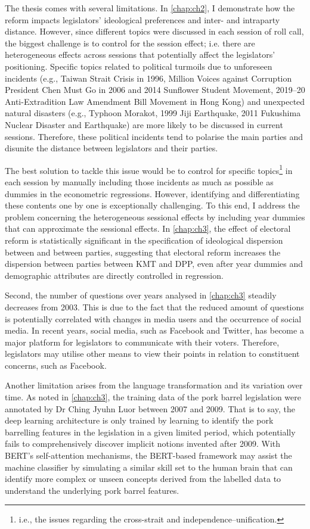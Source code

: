 The thesis comes with several limitations. In \autoref{chap:ch2}, I demonstrate how the reform impacts legislators' ideological preferences and inter- and intraparty distance. However, since different topics were discussed in each session of roll call, the biggest challenge is to control for the session effect; i.e. there are heterogeneous effects across sessions that potentially affect the legislators' positioning. Specific topics related to political turmoils due to unforeseen incidents (e.g., Taiwan Strait Crisis in 1996, Million Voices against Corruption President Chen Must Go in 2006 and 2014 Sunflower Student Movement, 2019–20 Anti-Extradition Law Amendment Bill Movement in Hong Kong) and unexpected natural disasters (e.g., Typhoon Morakot, 1999 Jiji Earthquake, 2011 Fukushima Nuclear Disaster and Earthquake) are more likely to be discussed in current sessions. Therefore, these political incidents tend to polarise the main parties and disunite the distance between legislators and their parties. 

The best solution to tackle this issue would be to control for specific topics\footnote{i.e., the issues regarding the cross-strait and independence–unification.} in each session by manually including those incidents as much as possible as dummies in the econometric regressions. However, identifying and differentiating these contents one by one is exceptionally challenging. To this end, I address the problem concerning the heterogeneous sessional effects by including year dummies that can approximate the sessional effects. In \autoref{chap:ch3}, the effect of electoral reform is statistically significant in the specification of ideological dispersion between and between parties, suggesting that electoral reform increases the dispersion between parties between KMT and DPP, even after year dummies and demographic attributes are directly controlled in regression.

Second, the number of questions over years analysed in \autoref{chap:ch3} steadily decreases from 2003. This is due to the fact that the reduced amount of questions is potentially correlated with changes in media users and the occurrence of social media. In recent years, social media, such as Facebook and Twitter, has become a major platform for legislators to communicate with their voters. Therefore, legislators may utilise other means to view their points in relation to constituent concerns, such as Facebook.

Another limitation arises from the language transformation and its variation over time. As noted in \autoref{chap:ch3}, the training data of the pork barrel legislation were annotated by Dr Ching Jyuhn Luor \citep{Luor2008, Luor2009} between 2007 and 2009. That is to say, the deep learning architecture is only trained by learning to identify the pork barrelling features in the legislation in a given limited period, which potentially fails to comprehensively discover implicit notions invented after 2009. With BERT's self-attention mechanisms, the BERT-based framework may assist the machine classifier by simulating a similar skill set to the human brain that can identify more complex or unseen concepts derived from the labelled data to understand the underlying pork barrel features.

